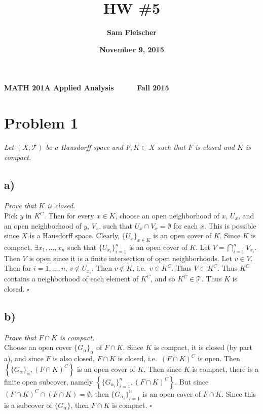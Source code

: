 \documentclass[12pt]{article}
\title{\bf HW \#5}
\author{\bf Sam Fleischer}
\date{\bf November 9, 2015}
\theoremstyle{plain}
\begin{document}
{\bf MATH 201A \hfill Applied Analysis \ \ \ \ \ \hfill Fall 2015} 

{\let\newpage\relax\maketitle}

\section*{Problem 1}
\emph{Let $(X, \mathcal{T})$ be a Hausdorff space and $F,K \subset X$ such that $F$ is closed and $K$ is compact.}

\subsection*{ a)}
\emph{Prove that $K$ is closed.} \\

Pick $y$ in $K^C$.  Then for every $x \in K$, choose an open neighborhood of $x$, $U_x$, and an open neighborhood of $y$, $V_x$, such that $U_x \cap V_x = \emptyset$ for each $x$.  This is possible since $X$ is a Hausdorff space.  Clearly, $\{U_x\}_{x\in K}$ is an open cover of $K$.  Since $K$ is compact, $\exists x_1, \dots, x_n$ such that $\{U_{x_i}\}_{i = 1}^n$ is an open cover of $K$.  Let $V = \bigcap_{i = 1}^n V_{x_i}$.  Then $V$ is open since it is a finite intersection of open neighborhoods.  Let $v \in V$.  Then for $i = 1, \dots, n$, $v \not\in U_{x_i}$.  Then $v \not\in K$, i.e.~$v \in K^C$.  Thus $V \subset K^C$.  Thus $K^C$ contains a neighborhood of each element of $K^C$, and so $K^C \in \mathcal{T}$.  Thus $K$ is closed. \hfill $\square$

\subsection*{ b)}
\emph{Prove that $F \cap K$ is compact.} \\

Choose an open cover $\{G_\alpha\}_\alpha$ of $F \cap K$.  Since $K$ is compact, it is closed (by part a), and since $F$ is also closed, $F \cap K$ is closed, i.e.~$(F \cap K)^C$ is open.  Then $\left\{\{G_\alpha\}_\alpha, (F \cap K)^C\right\}$ is an open cover of $K$.  Then since $K$ is compact, there is a finite open subcover, namely $\left\{\{G_{\alpha_i}\}_{i = 1}^n, (F \cap K)^C\right\}$.  But since $(F \cap K)^C \cap (F \cap K) = \emptyset$, then $\{G_{\alpha_i}\}_{i = 1}^n$ is an open cover of $F \cap K$.  Since this is a subcover of $\{G_\alpha\}$, then $F \cap K$ is compact. \hfill $\square$
\end{document}
